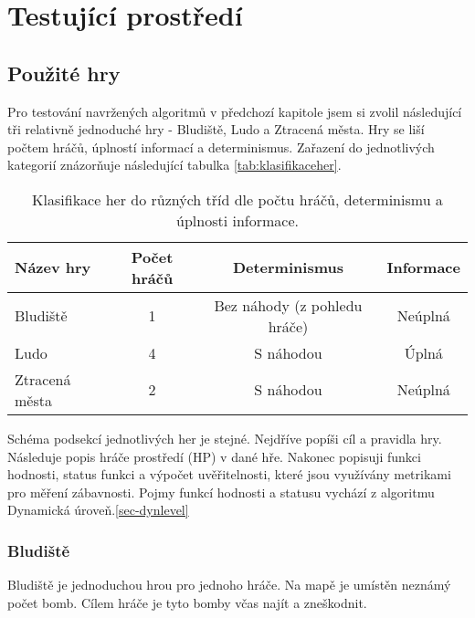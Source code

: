 \chapter{Testující prostředí}

\section{Použité hry}

Pro testování navržených algoritmů v předchozí kapitole jsem si zvolil následující tři relativně jednoduché hry - Bludiště, Ludo a Ztracená města. Hry se liší počtem hráčů, úplností informací a determinismus. Zařazení do jednotlivých kategorií znázorňuje následující tabulka \ref{tab:klasifikaceher}.

\begin{table*}[b]\footnotesize
\vspace*{0mm}
\caption{{\label{tab:klasifikaceher}} Klasifikace her do různých tříd dle počtu hráčů, determinismu a úplnosti informace. }
\vspace*{0mm}
\label{shadowtable}
\begin{center}
\begin{tabular}{| l || c | c | c |}
\hline
Název hry & Počet hráčů & Determinismus & Informace \\
\hline
\hline
Bludiště & 1 & Bez náhody (z pohledu hráče) & Neúplná \\ \hline
Ludo & 4 & S náhodou & Úplná \\ \hline
Ztracená města & 2 & S náhodou & Neúplná \\ \hline
\end{tabular}
\end{center}
\end{table*}

Schéma podsekcí jednotlivých her je stejné. Nejdříve popíši cíl a pravidla hry. Následuje popis hráče prostředí (HP) v dané hře. Nakonec popisuji funkci hodnosti, status funkci a výpočet uvěřitelnosti, které jsou využívány metrikami pro měření zábavnosti. Pojmy funkcí hodnosti a statusu vychází z algoritmu Dynamická úroveň.\ref{sec-dynlevel}

\subsection{Bludiště}

Bludiště je jednoduchou hrou pro jednoho hráče. Na mapě je umístěn neznámý počet bomb. Cílem hráče je tyto bomby včas najít a zneškodnit.

